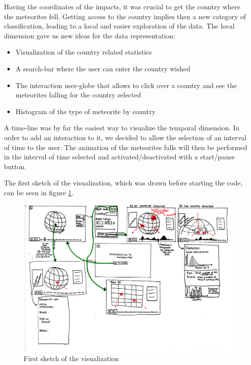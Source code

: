 \documentclass[10pt,conference,compsocconf]{IEEEtran}
\begin{document}
Having the coordinates of the impacts, it was crucial to get the country where the meteorites fell. Getting access to the country implies then a new category of classification, leading to a local and easier exploration of the data. The local dimension gave us new ideas for the data representation: 

\begin{itemize}
\item Visualization of the country related statistics
\item A search-bar where the user can enter the country wished
\item The interaction user-globe that allows to click over a country and see the meteorites falling for the country selected 
\item Histogram of the type of meteorite by country
\end{itemize}

A time-line was by far the easiest way to visualize the temporal dimension. In order to add an interaction to it, we decided to allow the selection of an interval of time to the user. The animation of the meteorites falls will then be performed in the interval of time selected and activated/deactivated with a start/pause button.

The first sketch of the visualization, which was drawn before starting the code, can be seen in figure \ref{fig:sketch1}.

\begin{figure}[]
  \centering
  \includegraphics[angle=-90,width=0.9\linewidth]{images/sketch1.jpg}
  \vspace{-3mm}
  \caption{First sketch of the visualization}
  \label{fig:sketch1}
\end{figure}
\end{document}
